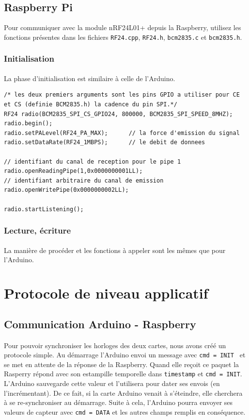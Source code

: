 \documentclass[a4paper, titlepage, oneside, 12pt]{article}%
\begin{document}
\subsection{Raspberry Pi}
Pour communiquer avec la module nRF24L01+ depuis la Raspberry, utilisez les fonctions présentes dans les fichiers \texttt{RF24.cpp}, \texttt{RF24.h}, \texttt{bcm2835.c} et \texttt{bcm2835.h}.

\subsubsection{Initialisation}
\paragraph{}
La phase d'initialisation est similaire à celle de l'Arduino. 

\begin{lstlisting}
/* les deux premiers arguments sont les pins GPIO a utiliser pour CE et CS (definie BCM2835.h) la cadence du pin SPI.*/
RF24 radio(BCM2835_SPI_CS_GPIO24, 800000, BCM2835_SPI_SPEED_8MHZ);
radio.begin();
radio.setPALevel(RF24_PA_MAX);		// la force d'emission du signal
radio.setDataRate(RF24_1MBPS);		// le debit de donnees

// identifiant du canal de reception pour le pipe 1
radio.openReadingPipe(1,0x0000000001LL);		
// identifiant arbitraire du canal de emission 
radio.openWritePipe(0x0000000002LL);

radio.startListening();
\end{lstlisting}

\subsubsection{Lecture, écriture}
\paragraph{}
La manière de procéder et les fonctions à appeler sont les mêmes que pour l'Arduino.

\section{Protocole de niveau applicatif}
\subsection{Communication Arduino - Raspberry}
\paragraph{}
Pour pouvoir synchroniser les horloges des deux cartes, nous avons créé un protocole simple.
Au démarrage l'Arduino envoi un message avec \texttt{cmd = INIT } et se met en attente de la réponse de la Raspberry. Quand elle reçoit ce paquet la Rasperry répond avec son estampille temporelle dans \texttt{timestamp} et \texttt{cmd = INIT}. L'Arduino sauvegarde cette valeur et l'utilisera pour dater ses envois (en l'incrémentant).
De ce fait, si la carte Arduino venait à s'éteindre, elle cherchera à se re-synchroniser au démarrage.
Suite à cela, l'Arduino pourra envoyer ses valeurs de capteur avec \texttt{cmd = DATA} et les autres champs remplis en conséquence.
\end{document}
